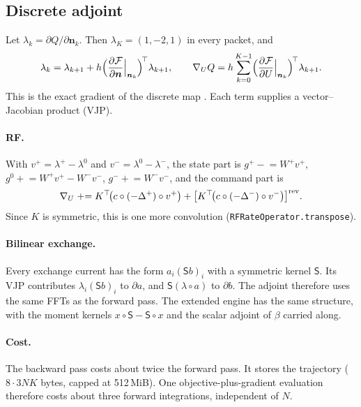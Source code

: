 \documentclass[11pt]{article}
\newcommand{\code}[1]{\texttt{#1}}
\begin{document}
\subsection{Discrete adjoint}
\label{sec:adjoint}

Let \(\lambda_k=\partial Q/\partial\bm n_k\). Then \(\lambda_K=(1,-2,1)\) in every packet, and
\begin{equation}
\lambda_k=\lambda_{k+1}+h\Bigl(\frac{\partial\mathcal{F}}{\partial \bm n}\Big|_{\bm n_k}\Bigr)^{\!\top}\lambda_{k+1},
\qquad
\nabla_UQ = h\sum_{k=0}^{K-1}\Bigl(\frac{\partial\mathcal{F}}{\partial U}\Big|_{\bm n_k}\Bigr)^{\!\top}\lambda_{k+1}.
\label{eq:adjoint}
\end{equation}
This is the exact gradient of the discrete map \cite{GilesPierce2000,Plessix2006}. Each term
supplies a vector--Jacobian product (VJP).

\paragraph{RF.} With \(v^+=\lambda^+-\lambda^0\) and \(v^-=\lambda^0-\lambda^-\), the state
part is
\(g^+\mathrel{-}=W^+v^+\), \(g^0\mathrel{+}=W^+v^+-W^-v^-\), \(g^-\mathrel{+}=W^-v^-\), and the
command part is
\begin{equation}
\nabla_U \mathrel{+}= K^{\top}\!\bigl(c\circ(-\Delta^+)\circ v^+\bigr)
+\bigl[K^{\top}\!\bigl(c\circ(-\Delta^-)\circ v^-\bigr)\bigr]^{\rm rev}.
\end{equation}
Since \(K\) is symmetric, this is one more convolution (\code{RFRateOperator.transpose}).

\paragraph{Bilinear exchange.} Every exchange current has the form \(a_i(\mathsf{S}b)_i\) with a
symmetric kernel \(\mathsf{S}\). Its VJP contributes \(\lambda_i(\mathsf{S}b)_i\) to
\(\partial a\), and \(\mathsf{S}(\lambda\circ a)\) to \(\partial b\). The adjoint therefore uses
the same FFTs as the forward pass. The extended engine has the same structure, with the moment
kernels \(x\circ\mathsf{S}-\mathsf{S}\circ x\) and the scalar adjoint of \(\beta\) carried along.

\paragraph{Cost.} The backward pass costs about twice the forward pass. It stores the trajectory
(\(8\cdot3NK\) bytes, capped at 512\,MiB). One objective-plus-gradient evaluation therefore costs
about three forward integrations, independent of \(N\).
\end{document}
